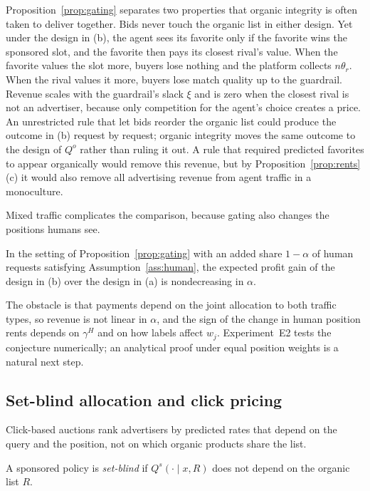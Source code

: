 \documentclass[opre,dblanonrev]{informs4}
\providecommand{\1}{\mathbf{1}}
\begin{document}
Proposition~\ref{prop:gating} separates two properties that organic integrity is often taken to deliver together. Bids never touch the organic list in either design. Yet under the design in (b), the agent sees its favorite only if the favorite wins the sponsored slot, and the favorite then pays its closest rival's value. When the favorite values the slot more, buyers lose nothing and the platform collects $n\theta_r$. When the rival values it more, buyers lose match quality up to the guardrail. Revenue scales with the guardrail's slack $\xi$ and is zero when the closest rival is not an advertiser, because only competition for the agent's choice creates a price. An unrestricted rule that let bids reorder the organic list could produce the outcome in (b) request by request; organic integrity moves the same outcome to the design of $Q^o$ rather than ruling it out. A rule that required predicted favorites to appear organically would remove this revenue, but by Proposition~\ref{prop:rents}(c) it would also remove all advertising revenue from agent traffic in a monoculture.

Mixed traffic complicates the comparison, because gating also changes the positions humans see.

\begin{conjecture}\label{conj:gating}
In the setting of Proposition~\ref{prop:gating} with an added share $1-\alpha$ of human requests satisfying Assumption~\ref{ass:human}, the expected profit gain of the design in (b) over the design in (a) is nondecreasing in $\alpha$.
\end{conjecture}

The obstacle is that payments depend on the joint allocation to both traffic types, so revenue is not linear in $\alpha$, and the sign of the change in human position rents depends on $\gamma^H$ and on how labels affect $w_j$. Experiment~E2 tests the conjecture numerically; an analytical proof under equal position weights is a natural next step.

\subsection{Set-blind allocation and click pricing}\label{sec:mechanism-click}

Click-based auctions rank advertisers by predicted rates that depend on the query and the position, not on which organic products share the list.

\begin{definition}\label{def:setblind}
A sponsored policy is \emph{set-blind} if $Q^s(\cdot\mid x,R)$ does not depend on the organic list $R$.
\end{definition}
\end{document}
